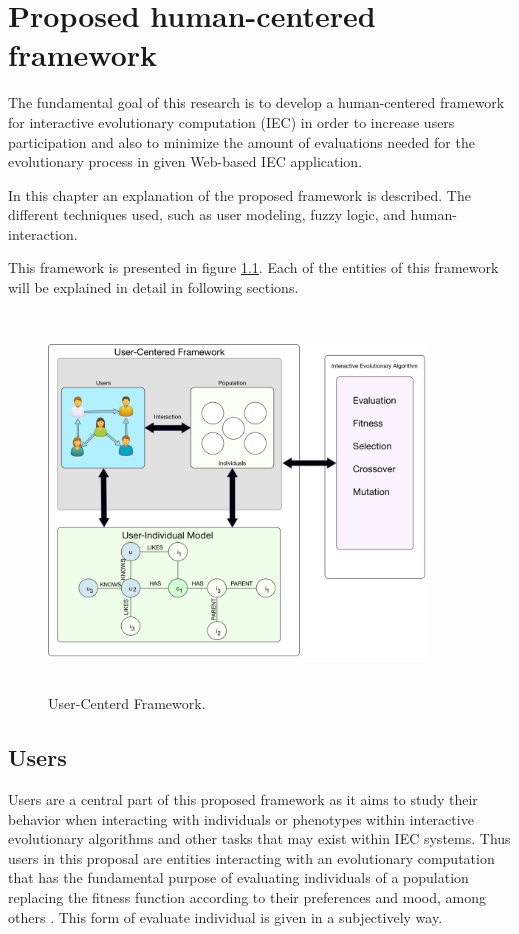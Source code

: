 \chapter{Proposed human-centered framework}

The fundamental goal of this research is to develop a human-centered framework
for interactive evolutionary computation (IEC) in order to increase users
participation and also to minimize the amount of evaluations needed for the
evolutionary process in given Web-based IEC application.

In this chapter an explanation of the proposed framework is described. The
different techniques used, such as user modeling, fuzzy logic, and human-
interaction.

This framework is presented in figure \ref{fig:uc_framework}. Each of the
entities of this framework will be explained in detail in following sections.

\begin{figure}
	\captionsetup{justification=centering,margin=2cm}
	\centering
	\setlength\fboxsep{0pt}
	\setlength\fboxrule{0.7pt}
	\includegraphics[width=10cm,height=10cm,keepaspectratio]{img/framework.png}
	\caption{User-Centerd Framework.}
	\label{fig:uc_framework}
\end{figure}

\section{Users}

Users are a central part of this proposed framework as it aims to study their
behavior when interacting
with individuals or phenotypes within interactive evolutionary
algorithms and other tasks that may exist within IEC systems. Thus users in this
proposal are entities interacting with an evolutionary computation that has the
fundamental purpose of evaluating individuals of a population replacing the
fitness function according to their preferences and mood, among others
\cite{takagi1998interactive}. This form of evaluate individual is given in a
subjectively way.

